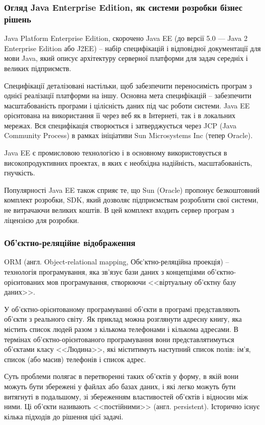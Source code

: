 \subsubsection{Огляд Java Enterprise Edition, як системи розробки бізнес рішень}
\par Java Platform Enterprise Edition, скорочено Java EE (до версії 5.0 — Java 2 Enterprise Edition або J2EE) -- набір специфікацій і відповідної документації для мови Java, який описує архітектуру серверної платформи для задач середніх і великих підприємств.
\par Специфікації деталізовані настільки, щоб забезпечити переносимість програм з однієї реалізації платформи на іншу. Основна мета специфікацій -- забезпечити масштабованість програми і цілісність даних під час роботи системи. Java EE орієнтована на використання її через веб як в Інтернеті, так і в локальних мережах. Вся специфікація створюється і затверджується через JCP (Java Community Process) в рамках ініціативи Sun Microsystems Inc (тепер Oracle).
\par Java EE є промисловою технологією і в основному використовується в високопродуктивних проектах, в яких є необхідна надійність, масштабованість, гнучкість.
\par Популярності Java EE також сприяє те, що Sun (Oracle) пропонує безкоштовний комплект розробки, SDK, який дозволяє підприємствам розробляти свої системи, не витрачаючи великих коштів. В цей комплект входить сервер програм з ліцензією для розробки.

\subsubsection{Об'єктно-реляційне відображення}
\par ORM (англ. Object-relational mapping, Обє'ктно-реляційна проекція) -- технологія програмування, яка зв'язує бази даних з концепціями об'єктно-орієнтованих мов програмування, створюючи <<віртуальну об'єктну базу даних>>.
\par У об'єктно-орієнтованому програмуванні об'єкти в програмі представляють об'єкти з реального світу. Як приклад можна розглянути адресну книгу, яка містить список людей разом з кількома телефонами і кількома адресами. В термінах об'єктно-орієнтованого програмування вони представлятимуться об'єктами класу <<Людина>>, які міститимуть наступний список полів: ім'я, список (або масив) телефонів і список адрес.
\par Суть проблеми полягає в перетворенні таких об'єктів у форму, в якій вони можуть бути збережені у файлах або базах даних, і які легко можуть бути витягнуті в подальшому, зі збереженням властивостей об'єктів і відносин між ними. Ці об'єкти називають <<постійними>> (англ. persistent). Історично існує кілька підходів до рішення цієї задачі.

